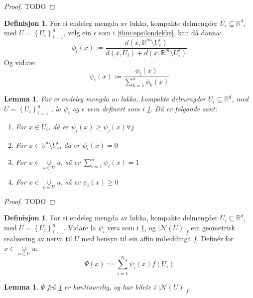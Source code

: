 \documentclass[a4paper, titlepage, 12pt, norsk]{article}
\theoremstyle{plain}
\newtheorem{lemma}[theorem]{Lemma}
\theoremstyle{definition}
\newtheorem{definition}[theorem]{Definisjon}
\newcommand{\Rb}{\mathbb{R}}
\newcommand{\Nc}{\mathcal{N}}
\newcommand{\union}{ \mathop{\cup}\limits }
\newcommand{\gr}[1]{ \lvert #1 \rvert } %
\newcommand{\set}[1]{ \left \{ #1 \right \} } %
\begin{document}
\begin{theroem}
\begin{proof}
	TODO
\end{proof}

\begin{definition} \label{thm:psi} %
	For ei endeleg mengda av lukka, kompakte delmengder \( U_i \subseteq \Rb^d \), med \( U = \set{U_i}_{i=1}^n \), velg ein \( \epsilon \) som i \ref{thm:epsilondekke}, kan då danna:
	\[
		\phi_i(x) := \frac{d(x, \Rb^m \setminus U_i^\epsilon)}{d(x, U_i) + d(x, \Rb^m \setminus U_i^\epsilon)}
	\]
	Og vidare:
	\[
		\psi_i(x) := \frac{\phi_i(x)}{\sum_{k=1}^n \phi_k(x)}
	\]
\end{definition}

\begin{lemma} %
	For ei endeleg mengda av lukka, kompakte delmengder \( U_i \subseteq \Rb^d \), med \( U = \set{U_i}_{i=1}^n \) , la \( \psi_i \) og \( \epsilon \) vera definert som i \ref{thm:psi}. Då er følgande sant:
	\begin{enumerate}
		\item{For \( x \in  U_i \), då er \( \psi_i(x) \geq \psi_j(x) \forall j \) }
		\item{For \( x \in \Rb^d \setminus U_i^\epsilon \), då er \( \psi_i(x)=0 \) }
		\item{For \( x \in \union_{u \in U} u \), så er \( \sum_{i=1}^n \psi_i(x) = 1 \) }
		\item{For \( x \in \union_{u \in U} u \), så er \( \psi_i(x) \geq 0 \) }
	\end{enumerate}
\end{lemma}

\begin{proof}
	TODO
\end{proof}

\begin{definition} \label{thm:Psi}
	For ei endeleg mengda av lukka, kompakte delmengder \( U_i \subseteq \Rb^d \), med \( U = \set{U_i}_{i=1}^n \). Vidare la \( \psi_i \) vera som i \ref{thm:psi}, og \( \gr{\Nc(U)}_f \) ein geometrisk realisering av nerva til \( U \) med hensyn til ein affin imbeddinga \( f \). Definér for \( x \in \union_{u \in U} u \):
	\[
		\Psi(x) := \sum_{i=1}^n \psi_i(x)f(U_i)
	\]
\end{definition}

\begin{lemma} %
	\( \Psi \) frå \ref{thm:Psi} er kontinuerlig, og har bilete i \( \gr{\Nc(U)}_f \).
\end{lemma}


\end{theroem}
\end{document}

